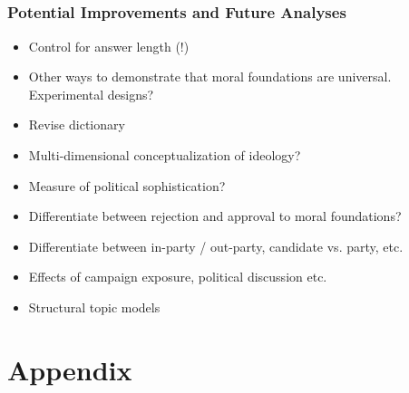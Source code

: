 \documentclass{beamer}
\begin{document}
\subsection{}
\begin{frame}%
  \frametitle{Potential Improvements and Future Analyses}
  \begin{itemize}
    \item Control for answer length (!)
    \item Other ways to demonstrate that moral foundations are universal. Experimental designs?
    \item Revise dictionary
    \item Multi-dimensional conceptualization of ideology?
    \item Measure of political sophistication?
    \item Differentiate between rejection and approval to moral foundations?
    \item Differentiate between in-party / out-party, candidate vs. party, etc.
    \item Effects of campaign exposure, political discussion etc.
    \item Structural topic models \citep{roberts2014structural}

  \end{itemize}
\end{frame}

\section{Appendix}
\end{document}
